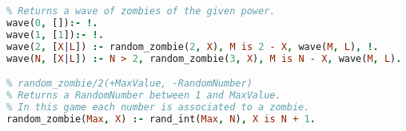 \begin{lstlisting}[language=Prolog, label=code:prolog-theory, caption=Prolog Theory.]
% wave/2(+WavePower, -ListOfZombies)
% Returns a wave of zombies of the given power.
wave(0, []):- !.
wave(1, [1]):- !.
wave(2, [X|L]) :- random_zombie(2, X), M is 2 - X, wave(M, L), !.
wave(N, [X|L]) :- N > 2, random_zombie(3, X), M is N - X, wave(M, L).

% random_zombie/2(+MaxValue, -RandomNumber)
% Returns a RandomNumber between 1 and MaxValue.
% In this game each number is associated to a zombie.
random_zombie(Max, X) :- rand_int(Max, N), X is N + 1.
\end{lstlisting}